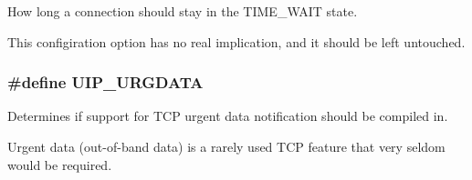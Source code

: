 How long a connection should stay in the TIME\_\-WAIT state. 

This configiration option has no real implication, and it should be left untouched. \hypertarget{a00074_g51c1cd531ff0afb81620151f2248cd21}{
\subsubsection[UIP\_\-URGDATA]{\setlength{\rightskip}{0pt plus 5cm}\#define UIP\_\-URGDATA}}
\label{a00074_g51c1cd531ff0afb81620151f2248cd21}


Determines if support for TCP urgent data notification should be compiled in. 

Urgent data (out-of-band data) is a rarely used TCP feature that very seldom would be required. 